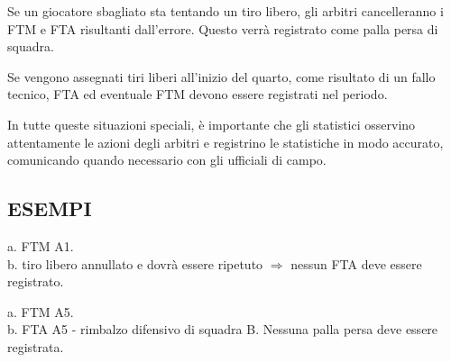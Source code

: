 Se un giocatore sbagliato sta tentando un tiro libero, gli arbitri cancelleranno i FTM e FTA risultanti dall'errore. Questo verrà registrato come palla persa di squadra.

Se vengono assegnati tiri liberi all'inizio del quarto, come risultato di un fallo tecnico, FTA ed eventuale FTM devono essere registrati nel periodo.

In tutte queste situazioni speciali, è importante che gli statistici osservino attentamente le azioni degli arbitri e registrino le statistiche in modo accurato, comunicando quando necessario con gli ufficiali di campo.

\subsection{ESEMPI}
\subsectionline

{a. FTM A1.
\\b. tiro libero annullato e dovrà essere ripetuto $\Rightarrow$ nessun FTA deve essere registrato.}

{a. FTM A5.
\\b. FTA A5 - rimbalzo difensivo di squadra B. Nessuna palla persa deve essere registrata.}
